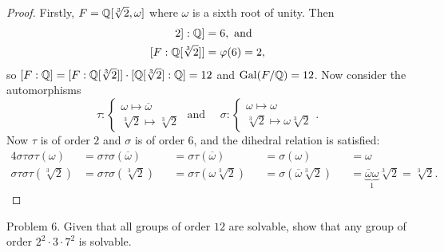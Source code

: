 \documentclass{article}
\begin{document}
\begin{proof}
  Firstly, $F = \mathbb Q[\sqrt[3]2, \omega]$ where $\omega$ is a sixth root of unity.
  Then \begin{align*}
    [\Q[\sqrt[3]2]:\Q] &= 6, \text{ and} \\
    [F:\Q[\sqrt[3]2]] &= \varphi(6) = 2,
  \end{align*}
  so $[F:\mathbb Q] = [F:\mathbb Q[\sqrt[3]2]]\cdot[\mathbb Q[\sqrt[3]2]:\mathbb Q] = 12$ and
  $\operatorname{Gal}(F/\mathbb Q) = 12$.
  Now consider the automorphisms \[
    \tau: \begin{cases}
      \omega \mapsto \overline\omega \\
      \sqrt[3]2 \mapsto \sqrt[3]2
    \end{cases} \text{ and ~~~}
    \sigma: \begin{cases}
        \omega \mapsto \omega \\
        \sqrt[3]2 \mapsto \omega\sqrt[3]2
      \end{cases}.
  \]
  Now $\tau$ is of order $2$ and $\sigma$ is of order $6$, and the dihedral
  relation is satisfied: \begin{alignat*}{4}
    \sigma\tau\sigma\tau(\omega) &= \sigma\tau\sigma(\overline\omega) &&= \sigma\tau(\overline\omega) &&= \sigma(\omega) &&= \omega \\
    \sigma\tau\sigma\tau(\sqrt[3]2) &= \sigma\tau\sigma(\sqrt[3]2) &&= \sigma\tau(\omega\sqrt[3]2) &&= \sigma(\overline\omega\sqrt[3]2) &&= \underbrace{\overline\omega\omega}_1\sqrt[3]2 = \sqrt[3]2.
  \end{alignat*}
\end{proof}
\pagebreak

\begin{subsection}{Problem 6.}
  Given that all groups of order $12$ are solvable, show that any group of order $2^2 \cdot 3 \cdot 7^2$ is solvable.
\end{subsection}
\end{document}
